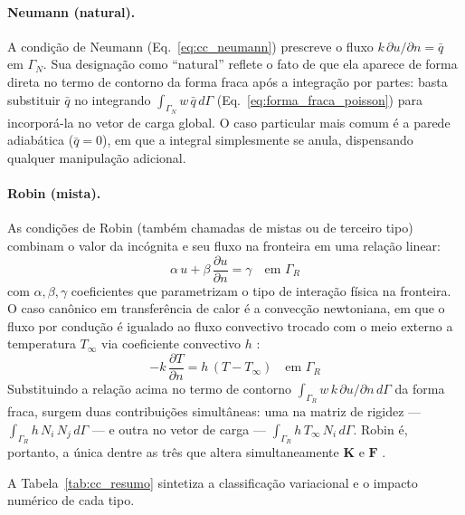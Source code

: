 \paragraph{Neumann (natural).} A condição de Neumann (Eq.~\ref{eq:cc_neumann}) prescreve o fluxo $k\,\partial u / \partial n = \bar{q}$ em $\Gamma_N$. Sua designação como ``natural'' reflete o fato de que ela aparece de forma direta no termo de contorno da forma fraca após a integração por partes: basta substituir $\bar{q}$ no integrando $\int_{\Gamma_N} w\,\bar{q}\,d\Gamma$ (Eq.~\ref{eq:forma_fraca_poisson}) para incorporá-la no vetor de carga global. O caso particular mais comum é a parede adiabática ($\bar{q} = 0$), em que a integral simplesmente se anula, dispensando qualquer manipulação adicional.

\paragraph{Robin (mista).} As condições de Robin (também chamadas de mistas ou de terceiro tipo) combinam o valor da incógnita e seu fluxo na fronteira em uma relação linear:
\begin{equation}
\alpha\,u + \beta\,\frac{\partial u}{\partial n} = \gamma \quad \text{em } \Gamma_R
\label{eq:cc_robin}
\end{equation}
com $\alpha, \beta, \gamma$ coeficientes que parametrizam o tipo de interação física na fronteira. O caso canônico em transferência de calor é a convecção newtoniana, em que o fluxo por condução é igualado ao fluxo convectivo trocado com o meio externo a temperatura $T_\infty$ via coeficiente convectivo $h$ \cite{Incropera2006}:
\begin{equation}
-k\,\frac{\partial T}{\partial n} = h\,(T - T_\infty) \quad \text{em } \Gamma_R
\label{eq:cc_robin_convectiva}
\end{equation}
Substituindo a relação acima no termo de contorno $\int_{\Gamma_R} w\,k\,\partial u/\partial n\,d\Gamma$ da forma fraca, surgem duas contribuições simultâneas: uma na matriz de rigidez --- $\int_{\Gamma_R} h\,N_i\,N_j\,d\Gamma$ --- e outra no vetor de carga --- $\int_{\Gamma_R} h\,T_\infty\,N_i\,d\Gamma$. Robin é, portanto, a única dentre as três que altera simultaneamente $\mathbf{K}$ e $\mathbf{F}$ \cite{Reddy2005}.

A Tabela~\ref{tab:cc_resumo} sintetiza a classificação variacional e o impacto numérico de cada tipo.

